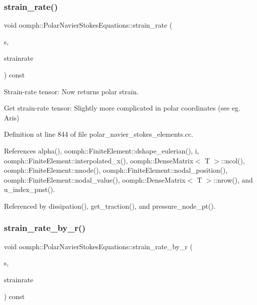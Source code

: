 \subsubsection{\texorpdfstring{strain\+\_\+rate()}{strain\_rate()}}
{\footnotesize\ttfamily void oomph\+::\+Polar\+Navier\+Stokes\+Equations\+::strain\+\_\+rate (\begin{DoxyParamCaption}\item[{const \hyperlink{classoomph_1_1Vector}{Vector}$<$ double $>$ \&}]{s,  }\item[{\hyperlink{classoomph_1_1DenseMatrix}{Dense\+Matrix}$<$ double $>$ \&}]{strainrate }\end{DoxyParamCaption}) const}



Strain-\/rate tensor\+: Now returns polar strain. 

Get strain-\/rate tensor\+: Slightly more complicated in polar coordinates (see eg. Aris) 

Definition at line 844 of file polar\+\_\+navier\+\_\+stokes\+\_\+elements.\+cc.



References alpha(), oomph\+::\+Finite\+Element\+::dshape\+\_\+eulerian(), i, oomph\+::\+Finite\+Element\+::interpolated\+\_\+x(), oomph\+::\+Dense\+Matrix$<$ T $>$\+::ncol(), oomph\+::\+Finite\+Element\+::nnode(), oomph\+::\+Finite\+Element\+::nodal\+\_\+position(), oomph\+::\+Finite\+Element\+::nodal\+\_\+value(), oomph\+::\+Dense\+Matrix$<$ T $>$\+::nrow(), and u\+\_\+index\+\_\+pnst().



Referenced by dissipation(), get\+\_\+traction(), and pressure\+\_\+node\+\_\+pt().

\mbox{\label{classoomph_1_1PolarNavierStokesEquations_a969a6d8caaa879136a4fb6ed00cc6cf2}} 
\subsubsection{\texorpdfstring{strain\+\_\+rate\+\_\+by\+\_\+r()}{strain\_rate\_by\_r()}}
{\footnotesize\ttfamily void oomph\+::\+Polar\+Navier\+Stokes\+Equations\+::strain\+\_\+rate\+\_\+by\+\_\+r (\begin{DoxyParamCaption}\item[{const \hyperlink{classoomph_1_1Vector}{Vector}$<$ double $>$ \&}]{s,  }\item[{\hyperlink{classoomph_1_1DenseMatrix}{Dense\+Matrix}$<$ double $>$ \&}]{strainrate }\end{DoxyParamCaption}) const}



